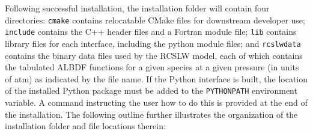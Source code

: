 \documentclass[preprint,12pt]{elsarticle}
\begin{document}
    Following successful installation, the installation folder will contain four directories:
    \texttt{cmake} contains relocatable CMake files for downstream developer use;
    \texttt{include} contains the C++ header files and a Fortran module file;
    \texttt{lib} contains library files for each interface, including the python module files;
    and \texttt{rcslw\textunderscore data} contains the binary data files used by the RCSLW model, each of which
    contains the tabulated ALBDF functions for a given species at a given pressure (in units of atm) as indicated by
    the file name. If the Python interface is built, the location of the installed Python package must be added
    to the \texttt{PYTHONPATH} environment variable. A command instructing the user how to do this is provided at the end of
    the installation. The following outline further illustrates the organization of the installation folder and file
    locations therein:
%
\end{document}
